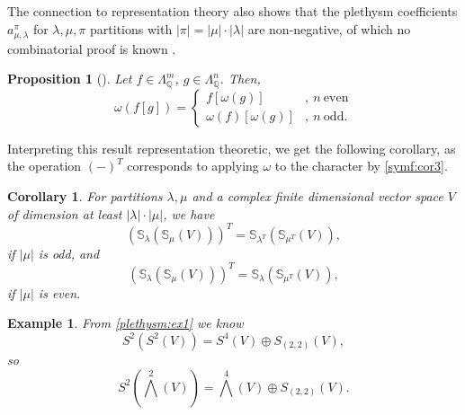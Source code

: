 \documentclass[a4paper]{amsart}
\newtheorem{proposition}{Proposition}
\newtheorem{example}{Example}
\newtheorem{corollary}{Corollary}
\def\Q{{\mathbb{Q}}}
\newcommand{\abs}[1]{\left| #1\right|}
\begin{document}
The connection to representation theory also shows that the plethysm coefficients $a_{\mu,\lambda}^\pi$ for $\lambda,\mu,\pi$ partitions with $\abs{\pi}=\abs{\mu}\cdot\abs{\lambda}$ are non-negative, of which no combinatorial proof is known \cite[p. 499]{Sta99}.
\begin{proposition}[{\cite[I.8, Ex. 1]{Mac98}}]\label{plethysm:prop2}
	Let $f\in\Lambda^m_{\Q}$, $g\in\Lambda^n_{\Q}$. Then,
	\begin{displaymath}
		\omega(f[g])=
		\begin{cases}
			f[\omega(g)]&,\mathrm{\ }n\mathrm{\ even}\\
			\omega(f)[\omega(g)]&,\mathrm{\ }n\mathrm{\ odd}.
		\end{cases}
	\end{displaymath}
\end{proposition}
Interpreting this result representation theoretic, we get the following corollary,
as the operation $(-)^T$ corresponds to applying $\omega$ to the character by \cref{symf:cor3}.
\begin{corollary}\label{plethysm:cor2}
	For partitions $\lambda,\mu$ and a complex finite dimensional vector space $V$ of dimension at least $\abs{\lambda}\cdot\abs{\mu}$, we have
	\begin{displaymath}
		\left(\mathbb{S}_\lambda(\mathbb{S}_\mu(V))\right)^T=
		\mathbb{S}_{\lambda^T}(\mathbb{S}_{\mu^T}(V)),
	\end{displaymath}
	if $\abs{\mu}$ is odd, and
	\begin{displaymath}
		\left(\mathbb{S}_\lambda(\mathbb{S}_\mu(V))\right)^T=
		\mathbb{S}_{\lambda}(\mathbb{S}_{\mu^T}(V)),
	\end{displaymath}
	if $\abs{\mu}$ is even.
\end{corollary}
\begin{example}
	From \cref{plethysm:ex1} we know
	\begin{displaymath}
		S^2(S^2(V))=S^4(V)\oplus S_{(2,2)}(V),
	\end{displaymath}
	so
	\begin{displaymath}
		S^2(\bigwedge^2(V))=\bigwedge^4(V)\oplus S_{(2,2)}(V).
	\end{displaymath}
\end{example}
\end{document}
